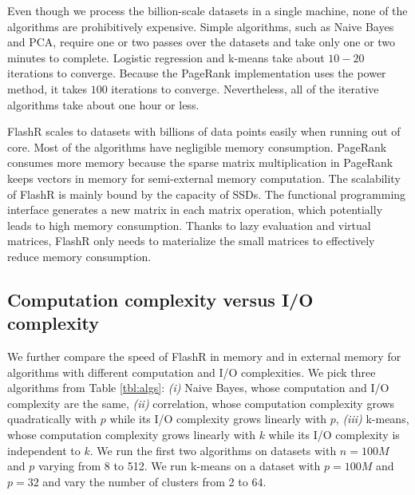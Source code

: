 Even though we process the billion-scale datasets in a single machine, none of
the algorithms are prohibitively expensive. Simple algorithms, such as
Naive Bayes and PCA, require one or two passes over the datasets and take
only one or two minutes to complete. Logistic regression and k-means take
about $10-20$ iterations to converge. Because the PageRank implementation
uses the power method, it takes $100$ iterations to converge.
Nevertheless, all of the iterative algorithms take about one hour or less.

FlashR scales to datasets with billions of data points easily when running
out of core. Most of the algorithms have negligible memory consumption.
PageRank consumes more memory because the sparse matrix multiplication in
PageRank keeps vectors in memory for semi-external memory computation.
The scalability of FlashR is mainly bound by the capacity of SSDs.
The functional programming
interface generates a new matrix in each matrix operation, which potentially
leads to high memory consumption. Thanks to lazy evaluation and virtual matrices,
FlashR only needs to materialize the small matrices to effectively reduce
memory consumption.

\subsection{Computation complexity versus I/O complexity}
We further compare the speed of FlashR in memory and in external memory
for algorithms with different computation and I/O complexities.
We pick three algorithms from Table \ref{tbl:algs}: \textit{(i)} Naive Bayes,
whose computation and I/O complexity are the same, \textit{(ii)}
correlation, whose computation complexity grows quadratically with $p$ while
its I/O complexity grows linearly with $p$, \textit{(iii)} k-means, whose computation
complexity grows linearly with $k$ while its I/O complexity is independent
to $k$. We run the first two algorithms on datasets with $n=100M$ and $p$
varying from 8 to 512. We run k-means on a dataset with $p=100M$ and $p=32$
and vary the number of clusters from 2 to 64.

